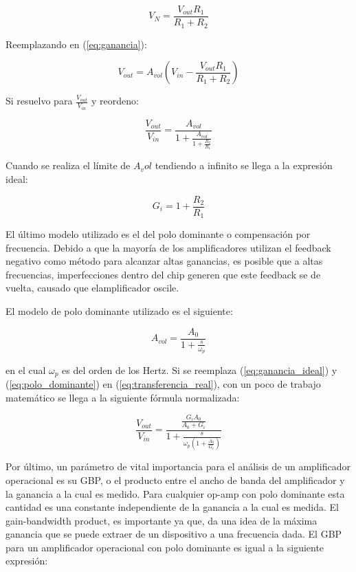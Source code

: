 \begin{equation}
V_N = \frac{V_{out}R_1}{R_1 + R_2}
\end{equation}

Reemplazando en (\ref{eq:ganancia}):

\begin{equation}
V_{out} = A_{vol}(V_{in} - \frac{V_{out}R_1}{R_1 + R_2})
\end{equation}

Si resuelvo para $\frac{V_{out}}{V_{in}}$ y reordeno:

\begin{equation}\label{eq:transferencia_real}
\frac{V_{out}}{V_{in}} = \frac{A_{vol}}{1 + \frac{A_{vol}}{1 + \frac{R_2}{R_1}}}
\end{equation}

Cuando se realiza el límite de $A_vol$ tendiendo a infinito se llega a la expresión ideal:

\begin{equation}\label{eq:ganancia_ideal}
G_i = 1 + \frac{R_2}{R_1}
\end{equation}

El último modelo utilizado es el del polo dominante o compensación por frecuencia. Debido a que la mayoría de los amplificadores utilizan el feedback negativo como método para alcanzar altas ganancias, es posible que a altas frecuencias, imperfecciones dentro del chip generen que este feedback se de vuelta, causado que elamplificador oscile. 


El modelo de polo dominante utilizado es el siguiente:

\begin{equation}\label{eq:polo_dominante}
A_{vol} = \frac{A_0}{1 + \frac{s}{\omega_p}}
\end{equation}

en el cual $\omega_p$ es del orden de los Hertz.
Si se reemplaza (\ref{eq:ganancia_ideal}) y (\ref{eq:polo_dominante}) en (\ref{eq:transferencia_real}), con un poco de trabajo matemático se llega a la siguiente fórmula normalizada:

\begin{equation}\label{eq:ganancia_completa_normalizada}
\frac{V_{out}}{V_{in}} = \frac{\frac{G_iA_0}{A_0 + G_i}}{1 + \frac{s}{\omega_p(1 + \frac{A_0}{G_i})}}
\end{equation}

Por último, un parámetro de vital importancia para el análisis de un amplificador operacional es su GBP, o el producto entre el ancho de banda del amplificador y la ganancia a la cual es medido. Para cualquier op-amp con polo dominante esta cantidad es una constante independiente de la ganancia a la cual es medida. El gain-bandwidth product, es importante ya que, da una idea de la máxima ganancia que se puede extraer de un dispositivo a una frecuencia dada. El GBP para un amplificador operacional con polo dominante es igual a la siguiente expresión:

